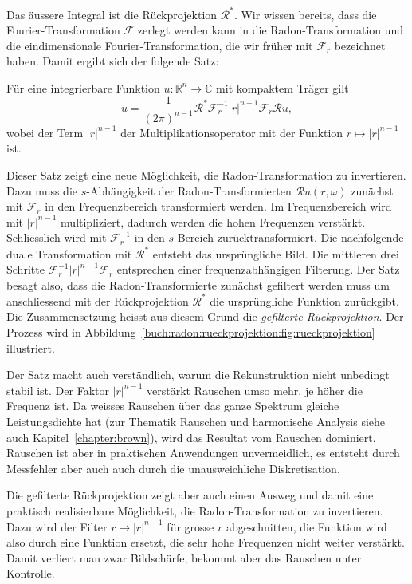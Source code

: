 Das äussere Integral ist die Rückprojektion $\mathscr{R}^*$.
Wir wissen bereits, dass die Fourier-Transformation $\mathscr{F}$
zerlegt werden kann in die Radon-Transformation und die
eindimensionale Fourier-Transformation, die wir früher mit
$\mathscr{F}_r$ bezeichnet haben.
Damit ergibt sich der folgende Satz:

\begin{satz}
Für eine integrierbare Funktion $u\colon\mathbb{R}^n\to\mathbb{C}$ mit kompaktem Träger gilt
\[
u
=
\frac{1}{(2\pi)^{n-1}}
\mathscr{R}^*
\mathscr{F}_r^{-1}
|r|^{n-1}
\mathscr{F}_r
\mathscr{R}u,
\]
wobei der Term $|r|^{n-1}$ der Multiplikationsoperator mit der
Funktion $r\mapsto |r|^{n-1}$ ist.
\end{satz}

Dieser Satz zeigt eine neue Möglichkeit, die Radon-Transformation
zu invertieren.
Dazu muss die $s$-Abhängigkeit der Radon-Transformierten
$\mathscr{R}u(r,\omega)$ 
zunächst mit $\mathscr{F}_r$ in den Frequenzbereich transformiert werden.
Im Frequenzbereich wird mit $|r|^{n-1}$ multipliziert, dadurch
werden die hohen Frequenzen verstärkt.
Schliesslich wird mit $\mathscr{F}_r^{-1}$ in den $s$-Bereich
zurücktransformiert.
Die nachfolgende duale Transformation mit $\mathscr{R}^*$ entsteht
das ursprüngliche Bild.
Die mittleren drei Schritte $\mathscr{F}_r^{-1}|r|^{n-1}\mathscr{F}_r$
entsprechen einer frequenzabhängigen Filterung.
Der Satz besagt also, dass die Radon-Transformierte zunächst
gefiltert werden muss um anschliessend mit der Rückprojektion
$\mathscr{R}^*$ die ursprüngliche Funktion zurückgibt.
Die Zusammensetzung heisst aus diesem Grund die {\em gefilterte
Rückprojektion}.
Der Prozess wird in
Abbildung~\ref{buch:radon:rueckprojektion:fig:rueckprojektion}
illustriert.

Der Satz macht auch verständlich, warum die Rekunstruktion nicht
unbedingt stabil ist. 
Der Faktor $|r|^{n-1}$ verstärkt Rauschen umso mehr, je höher
die Frequenz ist.
Da weisses Rauschen über das ganze Spektrum gleiche Leistungsdichte
hat (zur Thematik Rauschen und harmonische Analysis siehe auch 
Kapitel~\ref{chapter:brown}),
wird das Resultat vom Rauschen dominiert.
Rauschen ist aber in praktischen Anwendungen unvermeidlich, es
entsteht durch Messfehler aber auch auch durch die unausweichliche
Diskretisation.

Die gefilterte Rückprojektion zeigt aber auch einen Ausweg und 
damit eine praktisch realisierbare Möglichkeit, die Radon-Transformation
zu invertieren.
Dazu wird der Filter $r\mapsto |r|^{n-1}$ für grosse $r$ abgeschnitten,
die Funktion wird also durch eine Funktion ersetzt, die sehr
hohe Frequenzen nicht weiter verstärkt.
Damit verliert man zwar Bildschärfe, bekommt aber das Rauschen unter
Kontrolle.

